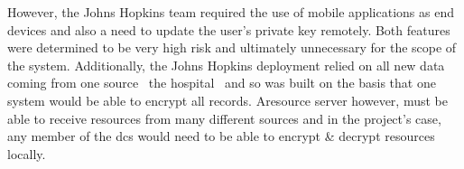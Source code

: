 However, the Johns Hopkins team required the use of mobile applications as end devices and also a need to update the user's private key remotely. Both features were determined to be very high risk and ultimately unnecessary for the scope of the \theResServer system. Additionally, the Johns Hopkins deployment relied on all new data coming from one source \textemdash\ the hospital \textemdash\ and so was built on the basis that one system would be able to encrypt all records. Aresource server however, must be able to receive resources from many different sources and in the project's case, any member of the \acrshort{dcs} would need to be able to encrypt \& decrypt resources locally.
